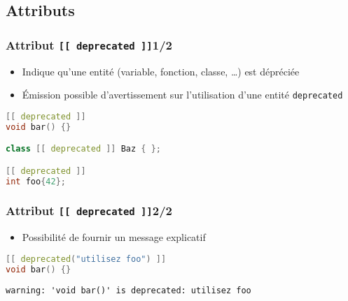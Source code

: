 \documentclass[C++.tex]{subfiles}
\begin{document}
\subsection*{Attributs}
\begin{frame}[fragile]
	\frametitle{Attribut \lstinline|[[ deprecated ]]|\titlehfill{}1/2}
	\begin{itemize}
		\item Indique qu'une entité (variable, fonction, classe, \ldots) est dépréciée
		\item Émission possible d'avertissement sur l'utilisation d'une entité \lstinline|deprecated|

	\end{itemize}

	\begin{lstlisting}[language=C++]
[[ deprecated ]]
void bar() {}

class [[ deprecated ]] Baz { };

[[ deprecated ]]
int foo{42};\end{lstlisting}
\end{frame}

\begin{frame}[fragile]
	\frametitle{Attribut \lstinline|[[ deprecated ]]|\titlehfill{}2/2}
	\begin{itemize}
		\item Possibilité de fournir un message explicatif
	\end{itemize}

	\begin{lstlisting}[language=C++]
[[ deprecated("utilisez foo") ]]
void bar() {}\end{lstlisting}

	\begin{lstlisting}
warning: 'void bar()' is deprecated: utilisez foo\end{lstlisting}
\end{frame}
\end{document}
